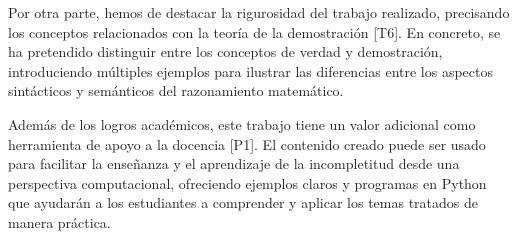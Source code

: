 Por otra parte, hemos de destacar la rigurosidad del trabajo realizado, precisando los conceptos relacionados con la teoría de la demostración [T6]. En concreto, se ha pretendido distinguir entre los conceptos de verdad y demostración, introduciendo múltiples ejemplos para ilustrar las diferencias entre los aspectos sintácticos y semánticos del razonamiento matemático.

Además de los logros académicos, este trabajo tiene un valor adicional como herramienta de apoyo a la docencia [P1]. El contenido creado puede ser usado para facilitar la enseñanza y el aprendizaje de la incompletitud desde una perspectiva computacional, ofreciendo ejemplos claros y programas en Python que ayudarán a los estudiantes a comprender y aplicar los temas tratados de manera práctica.

\endinput
